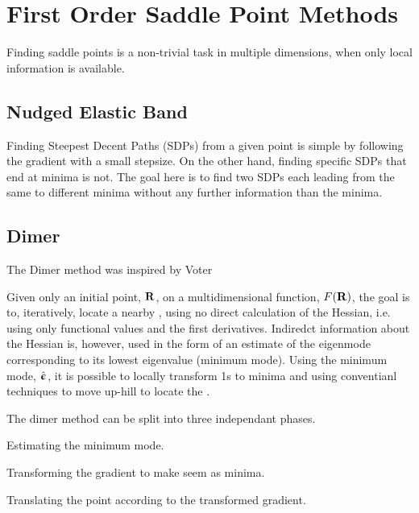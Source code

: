 \section{First Order Saddle Point Methods}
\label{sec:sps}

Finding saddle points is a non-trivial task in multiple dimensions, when only local information is available.

\incomplete

\subsection{Nudged Elastic Band}
\label{sec:neb}

Finding Steepest Decent Paths (SDPs) from a given point is simple by following the gradient with a small stepsize.
On the other hand, finding specific SDPs that end at minima is not.
The goal here is to find two SDPs each leading from the same  to different minima without any further information than the minima.


\incomplete

\subsection{Dimer}
\label{sec:dimer}

The Dimer method was inspired by Voter\cite{voter-hyperdynamics-1997}

Given only an initial point, ${\mathrm{\mathbf{\bm{R}}}}$, on a multidimensional function, $F({\mathrm{\mathbf{\bm{R}}}})$, the goal is to, iteratively, locate a nearby , using no direct calculation of the Hessian, i.e. using only functional values and the first derivatives.
Indiredct information about the Hessian is, however, used in the form of an estimate of the eigenmode corresponding to its lowest eigenvalue (minimum mode).
Using the minimum mode, $\hat{{\mathrm{\mathbf{\bm{\upepsilon}}}}}$, it is possible to locally transform \sap1s to minima and using conventianl techniques to move up-hill to locate the .

The dimer method can be split into three independant phases.
\item Estimating the minimum mode.
\item Transforming the gradient to make  seem as minima.
\item Translating the point according to the transformed gradient.
\een

